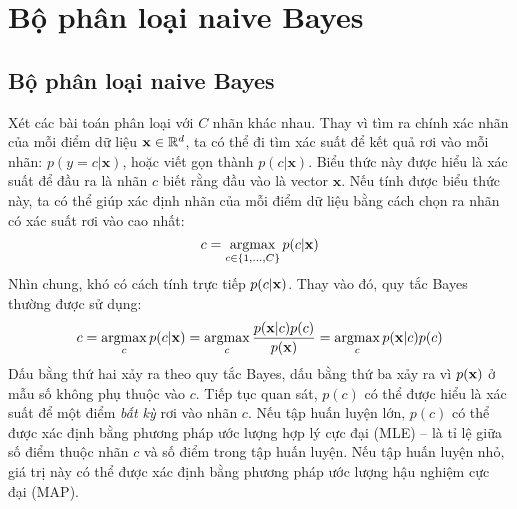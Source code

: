 \chapter{Bộ phân loại naive Bayes}
\label{cha:nbc}

\section{Bộ phân loại naive Bayes}

Xét các bài toán phân loại với $C$ nhãn khác nhau. Thay vì tìm ra chính
xác nhãn của mỗi điểm dữ liệu $\mathbf{x} \in \mathbb{R}^d$, ta có thể đi tìm xác suất để kết quả rơi vào mỗi nhãn:
\begin{math}
\label{eqn:32_1}
p(y = c |\mathbf{x})
\end{math},
hoặc viết gọn thành $p(c|\mathbf{x})$. Biểu thức này được hiểu là xác suất để
đầu ra là nhãn $c$ biết rằng đầu vào là vector $\mathbf{x}$. Nếu tính được biểu thức này, ta có thể giúp xác định nhãn của mỗi điểm dữ liệu bằng cách chọn ra
nhãn có xác suất rơi vào cao nhất:
\begin{equation}
\label{eqn:32_2}
c = \operatorname*{argmax}_{c \in \{1, \dots, C\}} p(c | \mathbf{x})
\end{equation}
Nhìn chung, khó có cách tính trực tiếp $p(c|\mathbf{x})$. Thay vào đó,
quy tắc Bayes thường được sử dụng:
\begin{align}
c =  \operatorname*{argmax}_c p(c | \mathbf{x}) =
\operatorname*{argmax}_c \frac{p(\mathbf{x} | c) p(c)}{p(\mathbf{x})}
=  \operatorname*{argmax}_c p(\mathbf{x} | c) p(c)
\end{align}
Dấu bằng thứ hai xảy ra theo quy tắc Bayes, dấu bằng thứ ba xảy ra vì $p(\mathbf{x})$ ở
mẫu số không phụ thuộc vào $c$. Tiếp tục quan sát, $p(c)$ có thể được hiểu là
xác suất để một điểm \textit{bất kỳ} rơi vào nhãn $c$. Nếu tập huấn luyện lớn,
$p(c)$ có thể được xác định bằng phương pháp ước lượng hợp lý cực đại (MLE) -- là
tỉ lệ giữa số điểm thuộc nhãn $c$ và số điểm trong tập huấn luyện. Nếu tập huấn
luyện nhỏ, giá trị này có thể được xác định bằng phương pháp ước lượng hậu
nghiệm cực đại (MAP).

